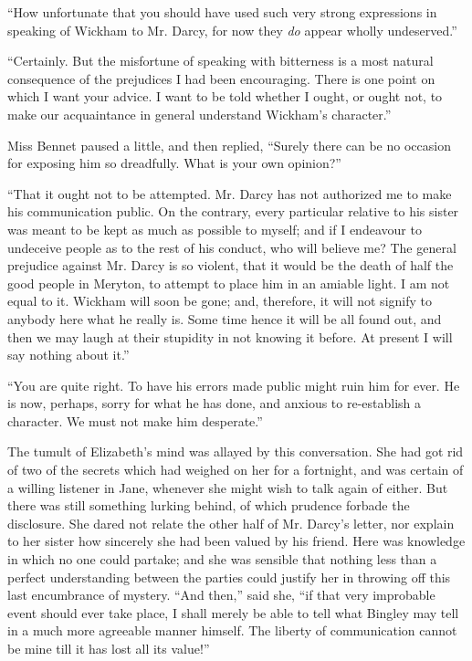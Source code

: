 \documentclass[12pt,openright]{book}
\begin{document}
“How unfortunate that you should have used such very strong expressions in speaking of Wickham to Mr. Darcy, for now they \textit{do} appear wholly undeserved.”

“Certainly. But the misfortune of speaking with bitterness is a most natural consequence of the prejudices I had been encouraging. There is one point on which I want your advice. I want to be told whether I ought, or ought not, to make our acquaintance in general understand Wickham’s character.”

Miss Bennet paused a little, and then replied, “Surely there can be no occasion for exposing him so dreadfully. What is your own opinion?”

“That it ought not to be attempted. Mr. Darcy has not authorized me to make his communication public. On the contrary, every particular relative to his sister was meant to be kept as much as possible to myself; and if I endeavour to undeceive people as to the rest of his conduct, who will believe me? The general prejudice against Mr. Darcy is so violent, that it would be the death of half the good people in Meryton, to attempt to place him in an amiable light. I am not equal to it. Wickham will soon be gone; and, therefore, it will not signify to anybody here what he really is. Some time hence it will be all found out, and then we may laugh at their stupidity in not knowing it before. At present I will say nothing about it.”

“You are quite right. To have his errors made public might ruin him for ever. He is now, perhaps, sorry for what he has done, and anxious to re-establish a character. We must not make him desperate.”

The tumult of Elizabeth’s mind was allayed by this conversation. She had got rid of two of the secrets which had weighed on her for a fortnight, and was certain of a willing listener in Jane, whenever she might wish to talk again of either. But there was still something lurking behind, of which prudence forbade the disclosure. She dared not relate the other half of Mr. Darcy’s letter, nor explain to her sister how sincerely she had been valued by his friend. Here was knowledge in which no one could partake; and she was sensible that nothing less than a perfect understanding between the parties could justify her in throwing off this last encumbrance of mystery. “And then,” said she, “if that very improbable event should ever take place, I shall merely be able to tell what Bingley may tell in a much more agreeable manner himself. The liberty of communication cannot be mine till it has lost all its value!”
\end{document}
